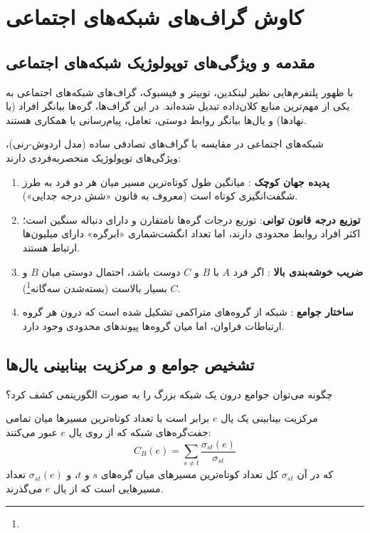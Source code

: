 \chapter{کاوش گراف‌های شبکه‌های اجتماعی \texorpdfstring{}{(Social-Network Graphs)}}
\label{ch:social-networks}

\section{مقدمه و ویژگی‌های توپولوژیک شبکه‌های اجتماعی}
با ظهور پلتفرم‌هایی نظیر لینکدین، توییتر و فیسبوک، گراف‌های شبکه‌های اجتماعی به یکی از مهم‌ترین منابع کلان‌داده تبدیل شده‌اند. در این گراف‌ها، گره‌ها بیانگر افراد (یا نهادها) و یال‌ها بیانگر روابط دوستی، تعامل، پیام‌رسانی یا همکاری هستند.

شبکه‌های اجتماعی در مقایسه با گراف‌های تصادفی ساده (مدل اردوش-رنی)، ویژگی‌های توپولوژیک منحصر‌به‌فردی دارند:
\begin{enumerate}
    \item \textbf{پدیده جهان کوچک }: میانگین طول کوتاه‌ترین مسیر میان هر دو فرد به طرز شگفت‌انگیزی کوتاه است (معروف به قانون «شش درجه جدایی»).
    \item \textbf{توزیع درجه قانون توانی}: توزیع درجات گره‌ها نامتقارن و دارای دنباله سنگین است؛ اکثر افراد روابط محدودی دارند، اما تعداد انگشت‌شماری «ابرگره» دارای میلیون‌ها ارتباط هستند.
    \item \textbf{ضریب خوشه‌بندی بالا }: اگر فرد $A$ با $B$ و $C$ دوست باشد، احتمال دوستی میان $B$ و $C$ بسیار بالاست (بسته‌شدن سه‌گانه\footnote{}).
    \item \textbf{ساختار جوامع }: شبکه از گروه‌های متراکمی تشکیل شده است که درون هر گروه ارتباطات فراوان، اما میان گروه‌ها پیوندهای محدودی وجود دارد.
\end{enumerate}

\section{تشخیص جوامع و مرکزیت بینابینی یال‌ها}
چگونه می‌توان جوامع درون یک شبکه بزرگ را به صورت الگوریتمی کشف کرد؟
\begin{definition}
مرکزیت بینابینی یک یال $e$ برابر است با تعداد کوتاه‌ترین مسیرها میان تمامی جفت‌گره‌های شبکه که از روی یال $e$ عبور می‌کنند:
\begin{equation}
C_B(e) = \sum_{s \ne t} \frac{\sigma_{st}(e)}{\sigma_{st}}
\end{equation}
که در آن $\sigma_{st}$ کل تعداد کوتاه‌ترین مسیرهای میان گره‌های $s$ و $t$، و $\sigma_{st}(e)$ تعداد مسیرهایی است که از یال $e$ می‌گذرند.
\end{definition}

